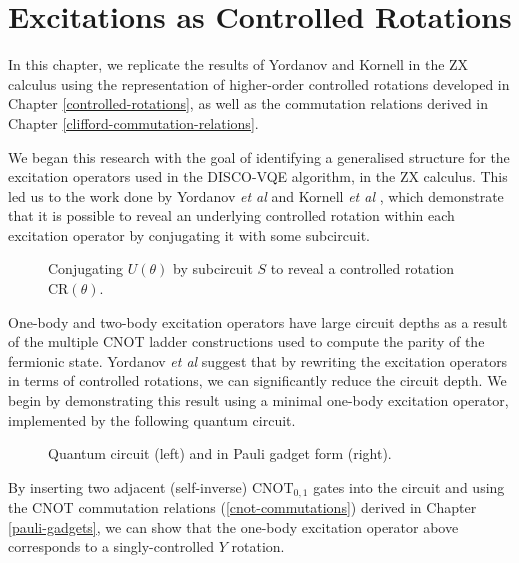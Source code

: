 \section{Excitations as Controlled Rotations}%
\label{operator-controlled-rotations}

In this chapter, we replicate the results of Yordanov and Kornell in the ZX calculus using the representation of higher-order controlled rotations developed in Chapter \ref{controlled-rotations}, as well as the commutation relations derived in Chapter \ref{clifford-commutation-relations}.

We began this research with the goal of identifying a generalised structure for the excitation operators used in the DISCO-VQE algorithm, in the ZX calculus. This led us to the work done by Yordanov \textit{et al} \cite{Yordanov2020} and Kornell \textit{et al} \cite{Kornell2023}, which demonstrate that it is possible to reveal an underlying controlled rotation within each excitation operator by conjugating it with some subcircuit.

\begin{figure}[H]
    \centering
    \caption{Conjugating $U(\theta)$ by subcircuit $S$ to reveal a controlled rotation CR$(\theta)$.}
\end{figure}

One-body and two-body excitation operators have large circuit depths as a result of the multiple CNOT ladder constructions used to compute the parity of the fermionic state. Yordanov \textit{et al} suggest that by rewriting the excitation operators in terms of controlled rotations, we can significantly reduce the circuit depth. We begin by demonstrating this result using a minimal one-body excitation operator, implemented by the following quantum circuit.

\begin{figure}[H]
    \centering
    \caption{Quantum circuit (left) and in Pauli gadget form (right).}
    \label{minimal-one-body}
\end{figure}

By inserting two adjacent (self-inverse) $\text{CNOT}_{0, 1}$ gates into the circuit and using the CNOT commutation relations (\ref{cnot-commutations}) derived in Chapter \ref{pauli-gadgets}, we can show that the one-body excitation operator above corresponds to a singly-controlled $Y$ rotation.


